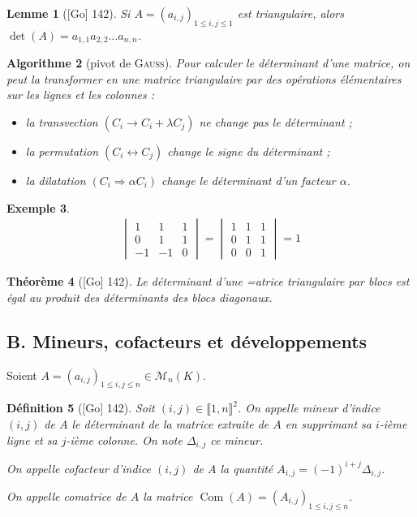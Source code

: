 \documentclass[10pt, a4paper, parskip=full, twoside, twocolumn]{report}
\newtheorem{definition}{Définition}
\newtheorem{theorem}[definition]{Théorème}
\newtheorem{lemma}[definition]{Lemme}
\newtheorem{example}[definition]{Exemple}
\newtheorem{algorithm}[definition]{Algorithme}
\DeclareMathOperator{\Com}{Com}
\begin{document}
\begin{lemma}[\textnormal{[Go] 142}]
	Si $A = \left(a_{i,j}\right)_{1\leq i,j\leq 1}$ est triangulaire, 
	alors $\det(A) = a_{1,1}a_{2,2}\dots a_{n,n}$.
\end{lemma}

\begin{algorithm}[pivot de \textsc{Gauss}]
	Pour calculer le déterminant d'une matrice, 
	on peut la transformer en une matrice triangulaire par des opérations élémentaires sur les lignes et 
	les colonnes :
	\begin{itemize}
		\item la transvection $(C_i \longrightarrow C_i+\lambda C_j)$ ne change pas le déterminant ;
		\item la permutation $(C_i \longleftrightarrow C_j)$ change le signe du déterminant ;
		\item la dilatation $(C_i \Longrightarrow \alpha C_i)$ change le déterminant d'un facteur $\alpha$.
	\end{itemize}
\end{algorithm}

\begin{example}
	\begin{align*}
		\begin{vmatrix}
			1&1&1\\
			0&1&1\\
			-1&-1&0
		\end{vmatrix}=
		\begin{vmatrix}
			1&1&1\\
			0&1&1\\
			0&0&1
		\end{vmatrix} = 1
	\end{align*}
\end{example}

\begin{theorem}[\textnormal{[Go] 142}]
	Le déterminant d'une =atrice triangulaire par blocs est égal au produit des déterminants des blocs diagonaux.
\end{theorem}


\subsection*{B. Mineurs, cofacteurs et développements}

\textcolor{paragraphtext}{Soient $A=\left(a_{i,j}\right)_{1\leq i,j\leq n}\in\mathcal{M}_n(K)$.}
\begin{definition}[\textnormal{[Go] 142}]
	Soit $(i,j)\in \llbracket 1,n \rrbracket ^2$.
	On appelle \emph{mineur d'indice $(i,j)$ de $A$} le déterminant de la matrice extraite de $A$
	en supprimant sa $i$-ième ligne et sa $j$-ième colonne.
	On note $\Delta_{i,j}$ ce mineur.
	
	On appelle \emph{cofacteur d'indice $(i,j)$ de $A$} la quantité $A_{i,j} = \left(-1\right)^{i+j}\Delta_{i,j}$.

	On appelle \emph{comatrice de $A$} la matrice $\Com(A) = \left(A_{i,j}\right)_{1\leq i,j\leq n}$.
\end{definition}
\end{document}
